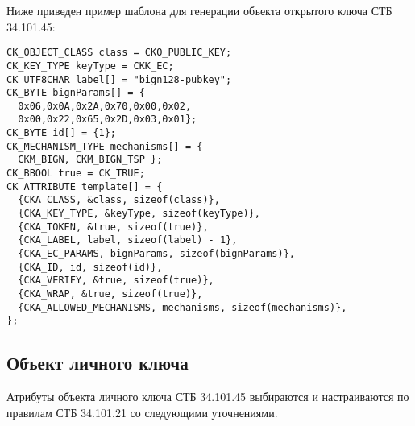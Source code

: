 Ниже приведен пример шаблона для генерации объекта открытого ключа СТБ 34.101.45:
\begin{verbatim}
CK_OBJECT_CLASS class = CKO_PUBLIC_KEY;
CK_KEY_TYPE keyType = CKK_EC;
CK_UTF8CHAR label[] = "bign128-pubkey";
CK_BYTE bignParams[] = {
  0x06,0x0A,0x2A,0x70,0x00,0x02,
  0x00,0x22,0x65,0x2D,0x03,0x01};
CK_BYTE id[] = {1};
CK_MECHANISM_TYPE mechanisms[] = {
  CKM_BIGN, CKM_BIGN_TSP };
CK_BBOOL true = CK_TRUE;
CK_ATTRIBUTE template[] = {
  {CKA_CLASS, &class, sizeof(class)},
  {CKA_KEY_TYPE, &keyType, sizeof(keyType)},
  {CKA_TOKEN, &true, sizeof(true)},
  {CKA_LABEL, label, sizeof(label) - 1},
  {CKA_EC_PARAMS, bignParams, sizeof(bignParams)},
  {CKA_ID, id, sizeof(id)},
  {CKA_VERIFY, &true, sizeof(true)},
  {CKA_WRAP, &true, sizeof(true)},
  {CKA_ALLOWED_MECHANISMS, mechanisms, sizeof(mechanisms)},
};
\end{verbatim}

\subsection{Объект личного ключа}\label{CRYPTOKI.Privkey}


Атрибуты объекта личного ключа СТБ 34.101.45 
выбираются и настраиваются по правилам СТБ 34.101.21 со 
следующими уточнениями.

